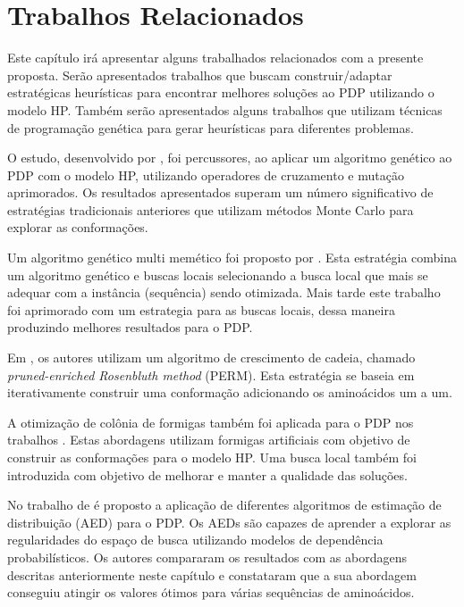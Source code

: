 \chapter{Trabalhos Relacionados}
\label{cap:Trabalhos Relacionados}

Este capítulo irá apresentar alguns trabalhados relacionados com a presente proposta. Serão apresentados trabalhos que buscam construir/adaptar estratégicas heurísticas para encontrar melhores soluções ao PDP utilizando o modelo HP. Também serão apresentados alguns trabalhos que utilizam técnicas de programação genética para gerar heurísticas para diferentes problemas.



O estudo, desenvolvido por \cite{unger1993genetic}, foi percussores, ao aplicar um algoritmo genético ao PDP com o modelo HP, utilizando operadores de cruzamento e mutação aprimorados. Os resultados apresentados superam um número significativo de estratégias tradicionais anteriores que utilizam métodos Monte Carlo para explorar as conformações. 

Um algoritmo genético multi memético foi proposto por \cite{krasnogor2002multimeme}. Esta estratégia combina um algoritmo genético e buscas locais selecionando a busca local que mais se adequar com a instância (sequência) sendo otimizada. Mais tarde este trabalho foi aprimorado com um estrategia  para as buscas locais, dessa maneira produzindo melhores resultados para o PDP.

Em \cite{hsu2003growth}, os autores utilizam um algoritmo de crescimento de cadeia, chamado \textit{pruned-enriched Rosenbluth method} (PERM). Esta estratégia se baseia em iterativamente construir uma conformação adicionando os aminoácidos um a um. 

A otimização de colônia de formigas também foi aplicada para o PDP nos trabalhos \cite{shmygelska2002ant,shmygelska2003improved}. Estas abordagens utilizam formigas artificiais com objetivo de construir as conformações para o modelo HP. Uma busca local também foi introduzida com objetivo de melhorar e manter a qualidade das soluções. 

No trabalho de \cite{santanna2008} é proposto a aplicação de diferentes algoritmos de estimação de distribuição (AED) para o PDP. Os AEDs são capazes de aprender a explorar as regularidades do espaço de busca utilizando modelos de dependência probabilísticos. Os autores compararam os resultados com as abordagens descritas anteriormente neste capítulo e constataram que a sua abordagem conseguiu atingir os valores ótimos para várias sequências de aminoácidos.

